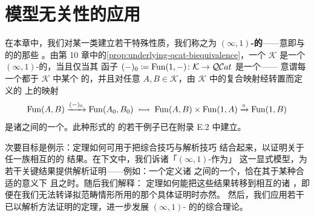 \chapter{模型无关性的应用}\label{ch:applications-model-independence}


在本章中，我们对某一类\trInfinityCosmos{}建立若干特殊性质，我们称之为%
\textbf{$(\infty,1)$-\trCategory{}的\trInfinityCosmos}——意即与%
\trQuasiCategory{}的\trInfinityCosmos\trBiequivalence{}的那些%
\trInfinityCosmos。由第 10 章中的\cref{prop:underlying-qcat-biequivalence}，一个\trInfinityCosmos{} $\mathcal{K}$ 是一个%
$(\infty,1)$-\trCategory{}的\trInfinityCosmos，当且仅当其%
\trUnderlyingQuasiCategory{}函子
$(-)_0\coloneqq\operatorname{Fun}(1,-)\colon\mathcal{K}\to\mathcal{Q}\mathcal{C}at$ 是一个\trBiequivalence——
意谓每一个\trQuasiCategory{}都\trEquivalence{}于 $\mathcal{K}$ 中某个%
\trInfinityCategory{}的\trUnderlyingQuasiCategory，并且对任意%
$A,B\in\mathcal{K}$，由 $\mathcal{K}$ 中的复合映射经转置而定义的%
\trFunctorSpace{}上的映射
\[
  \operatorname{Fun}(A,B)\xrightarrow{(-)_0}\operatorname{Fun}(A_0,B_0)
  \;\leftrightsquigarrow\;
  \operatorname{Fun}(A,B)\times\operatorname{Fun}(1,A)\xrightarrow{\circ}\operatorname{Fun}(1,B)
\]
是诸\trQuasiCategory{}之间的一个\trEquivalence。此种形式的%
\trInfinityCosmos{}的若干例子已在附录 E.2 中建立。

次要目标是例示：\trModelIndependence{}定理如何可用于把综合技巧与解析技巧
结合起来，以证明关于任一族相互\trBiequivalence{}的\trInfinityCosmos{}的
结果。在下文中，我们诉诸「$(\infty,1)$-\trCategory{}作为\trQuasiCategory{}」
这一显式模型，为若干关键结果提供解析证明——例如：一个\trFunctor{}定义诸%
\trQuasiCategory{}之间的一个\trEquivalence，恰在其于某种合适的意义下%
\trFullyFaithful{}且\trEssentiallySurjective{}之时。随后我们解释：%
\trModelIndependence{}定理如何能把这些结果转移到相互\trBiequivalence{}的诸%
\trInfinityCosmos，即便在我们无法转译拟范畴情形所用的那个具体证明时亦然。
然后，我们应用若干已以解析方法证明的定理，进一步发展 $(\infty,1)$-%
\trCategory{}的\trInfinityCosmos{}的综合理论。

